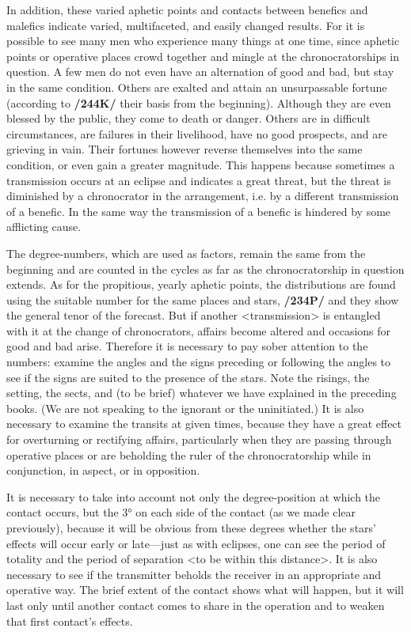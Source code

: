 In addition, these varied aphetic points and contacts between benefics and malefics indicate varied, multifaceted, and easily changed results. For it is possible to see many men who experience many things at one time, since aphetic points or operative places crowd together and mingle at the chronocratorships in question. A few men do not even have an alternation of good and bad, but stay in the same condition.
Others are exalted and attain an unsurpassable fortune (according to \textbf{/244K/} their basis from the beginning). Although they are even blessed by the public, they come to death or danger. Others are in difficult circumstances, are failures in their livelihood, have no good prospects, and are grieving in vain. Their fortunes however reverse themselves into the same condition, or even gain a greater magnitude. This happens because sometimes a transmission occurs at an eclipse and indicates a great threat, but the threat is diminished by a chronocrator in the arrangement, i.e. by a different transmission of a benefic. In the same way the transmission of a benefic is hindered by some afflicting cause.

The degree-numbers, which are used as factors, remain the same from the beginning and are counted in the cycles as far as the chronocratorship in question extends. As for the propitious, yearly aphetic points, the distributions are found using the suitable number for the same places and stars, \textbf{/234P/} and they show
the general tenor of the forecast. But if another <transmission> is entangled with it at the change of chronocrators, affairs become altered and occasions for good and bad arise. Therefore it is necessary to pay sober attention to the numbers: examine the angles and the signs preceding or following the angles to see if the signs are suited to the presence of the stars. Note the risings, the setting, the sects, and (to be brief) whatever we have explained in the preceding books. (We are not speaking to the ignorant or the uninitiated.) It is also necessary to examine the transits at given times, because they have a great effect for overturning or rectifying affairs, particularly when they are passing through operative places or are beholding the ruler of the chronocratorship while in conjunction, in aspect, or in opposition.

It is necessary to take into account not only the degree-position at which the contact occurs, but the 3° on each side of the contact (as we made clear previously), because it will be obvious from these degrees whether the stars’ effects will occur early or late—just as with eclipses, one can see the period of totality and the period of separation <to be within this distance>. It is also necessary to see if the transmitter beholds the receiver in an appropriate and operative way. The brief extent of the contact shows what will
happen, but it will last only until another contact comes to share in the operation and to weaken that first contact’s effects.

